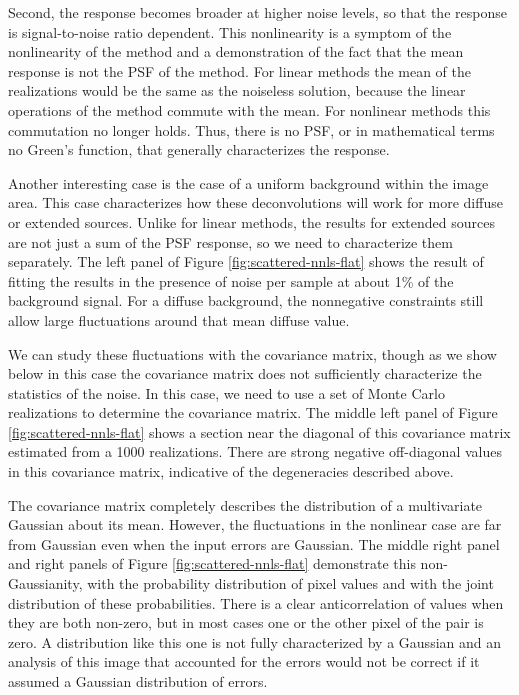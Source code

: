 \documentclass[twocolumn,tighten]{aastex61}
\begin{document}
Second, the response becomes broader at higher noise levels, so that
the response is signal-to-noise ratio dependent. This nonlinearity is
a symptom of the nonlinearity of the method and a demonstration of the
fact that the mean response is not the PSF of the method.  For linear
methods the mean of the realizations would be the same as the
noiseless solution, because the linear operations of the method
commute with the mean. For nonlinear methods this commutation no
longer holds. Thus, there is no PSF, or in mathematical terms no
Green's function, that generally characterizes the response.

Another interesting case is the case of a uniform background within
the image area. This case characterizes how these deconvolutions will
work for more diffuse or extended sources. Unlike for linear methods,
the results for extended sources are not just a sum of the PSF
response, so we need to characterize them separately.  The left panel
of Figure \ref{fig:scattered-nnls-flat} shows the result of fitting
the results in the presence of noise per sample at about 1\% of the
background signal. For a diffuse background, the nonnegative
constraints still allow large fluctuations around that mean diffuse
value.

We can study these fluctuations with the covariance matrix, though as
we show below in this case the covariance matrix does not sufficiently
characterize the statistics of the noise. In this case, we need to use
a set of Monte Carlo realizations to determine the covariance matrix.
The middle left panel of Figure \ref{fig:scattered-nnls-flat} shows a
section near the diagonal of this covariance matrix estimated from
a 1000 realizations. There are strong negative off-diagonal values in
this covariance matrix, indicative of the degeneracies described
above.

The covariance matrix completely describes the distribution of a
multivariate Gaussian about its mean. However, the fluctuations in the
nonlinear case are far from Gaussian even when the input errors are
Gaussian. The middle right panel and right panels of Figure
\ref{fig:scattered-nnls-flat} demonstrate this non-Gaussianity, with
the probability distribution of pixel values and with the joint
distribution of these probabilities. There is a clear anticorrelation
of values when they are both non-zero, but in most cases one or the
other pixel of the pair is zero. A distribution like this one is not
fully characterized by a Gaussian and an analysis of this image that
accounted for the errors would not be correct if it assumed a Gaussian
distribution of errors.
\end{document}
